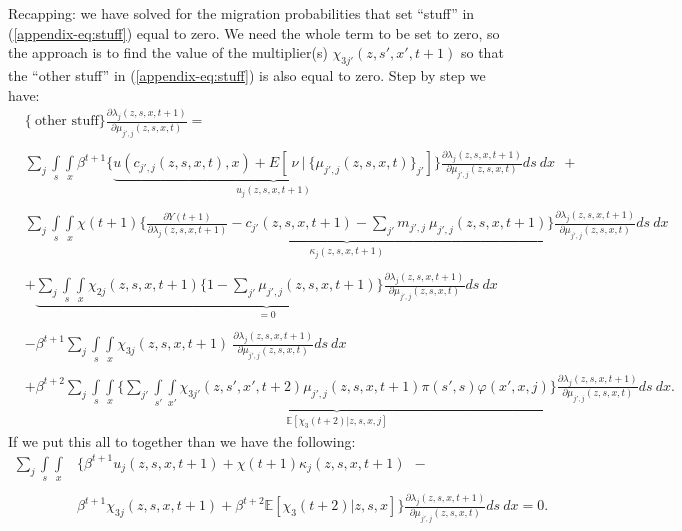 \documentclass[12pt,pdftex]{article}
\begin{document}
Recapping: we have solved for the migration probabilities that set ``stuff'' in (\ref{appendix-eq:stuff}) equal to zero. We need the whole term to be set to zero, so the approach is to find the value of the multiplier(s) $\chi_{3j'}(z, s',x', t+1)$ so that the ``other stuff'' in (\ref{appendix-eq:stuff}) is also equal to zero. Step by step we have:
{\small
\begin{align}
& \bigg \{ \ \mbox{other \ stuff} \bigg \} \frac{\partial \lambda_{j}(z, s, x, t+1)}{\partial \mu_{j',j}(z, s, x,t)} =  \\
\nonumber \\
& \sum_{j}  \int\limits_{s} \int\limits_{x} \beta^{t+1} \bigg \{ \underbrace{u(c_{j',j}(z, s, x, t), x) + E[ \ \nu \ | \ \big\{\mu_{j',j}(z,s,x,t)\big\}_{j'}] }_{u_{j}(z,s,x,t+1)}\bigg \}  \frac{\partial \lambda_{j}(z, s, x, t+1)}{\partial \mu_{j',j}(z, s,x,t)} ds \ dx \ \ + \ \ \\
\nonumber \\
& \sum_{j} \int\limits_{s} \int\limits_{x}  \chi(t+1) \Bigg \{ \underbrace{\frac{\partial Y(t+1)}{\partial \lambda_{j}(z, s, x, t+1)} - c_{j'}(z,s,x,t+1) - \sum_{j'}  m_{j',j} \ \mu_{j',j}(z, s, x, t+1)}_{\kappa_j(z, s, x, t+1)} \Bigg \} \frac{\partial \lambda_{j}(z,s,x, t+1)}{\partial \mu_{j',j}(z,s,x,t)} ds \ dx\\
\nonumber \\
& + \underbrace{\sum_{j} \int\limits_{s} \int\limits_{x} \chi_{2j}(z, s, x, t+1) \bigg \{1 - \sum_{j'} \mu_{j',j}(z, s,x,t+1) \bigg \} \frac{\partial \lambda_{j}(z,s,x, t+1)}{\partial \mu_{j',j}(z,s,x,t)} ds \ dx }_{ = 0} \\
\nonumber \\
& - \beta^{t+1} \sum_{j} \int\limits_{s} \int\limits_{x} \chi_{3j}(z, s, x, t+1) \ \frac{\partial \lambda_{j}(z, s, x,t+1)}{\partial \mu_{j',j}(z,s,x,t)} ds \ dx  \\
\nonumber \\
& + \beta^{t+2}\sum_{j} \int\limits_{s}  \int\limits_{x} \bigg \{ \underbrace{ \sum_{j'}  \int\limits_{s'} \int\limits_{x'} \chi_{3j'}(z, s',x', t+2) \mu_{j',j}(z, s, x, t+1) \pi(s',s) \varphi(x',x, j) }_{\mathbb{E}\left[\chi_{3}(t+2) |z, s, x, j \right]} \bigg \}  \frac{\partial \lambda_{j}(z, s, x, t+1)}{\partial \mu_{j',j}(z, s,x,t)} ds \ dx.
\end{align}}
If we put this all to together than we have the following:
{\small
\begin{align}
\sum_{j}  \int\limits_{s} \int\limits_{x} &\bigg \{ \beta^{t+1} u_{j}(z,s,x,t+1) + \chi(t+1) \kappa_j(z,s,x,t+1) \ \ - \ \ \\
\nonumber \\
&\beta^{t+1}\chi_{3j}(z,s,x, t+1) + \beta^{t+2}\mathbb{E}\left[\chi_{3}(t+2) | z,s,x \right] \bigg \} \frac{\partial \lambda_{j}(z,s,x,t+1)}{\partial \mu_{j',j}(z,s,x,t)} ds \ dx = 0.
\end{align}}
\end{document}
